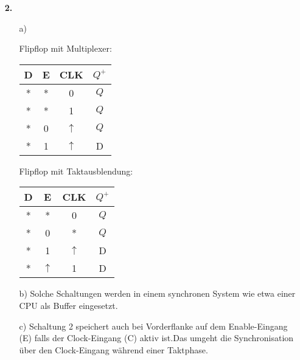 \documentclass[a4paper,10pt]{scrartcl}
\begin{document}
\begin{enumerate}
\begin{tikzpicture}[x=0.5cm,y=0.5cm]
    \end{tikzpicture}
    \vspace{1em}

    \item[\textbf{2.}]
        \begin{enumerate}
            \item[a)]
                \begin{minipage}[t]{0.4\textwidth}
                Flipflop mit Multiplexer:\\

                    \begin{tabular}{|c|c|c||c|}
                        \hline
                        D & E & CLK & $Q^+$ \\ \hline
                        * & * & 0   & $Q$ \\
                        * & * & 1   & $Q$ \\
                        * & 0 & $\uparrow$ & $Q$ \\
                        * & 1 & $\uparrow$ & D \\
                        \hline
                    \end{tabular}

                \end{minipage}
                \begin{minipage}[t]{0.4\textwidth}
                Flipflop mit Taktausblendung:\\

                    \begin{tabular}{|c|c|c||c|}
                        \hline
                        D & E & CLK & $Q^+$ \\ \hline
                        * & * & 0   & $Q$ \\
                        * & 0 & *   & $Q$ \\
                        * & 1 & $\uparrow$ & D \\
                        * & $\uparrow$ & 1 & D \\
                        \hline
                    \end{tabular}
                \end{minipage}
                \vspace{1em}

            \item[b)]
                Solche Schaltungen werden in einem synchronen System wie etwa einer CPU als Buffer eingesetzt.
            \item[c)]
                Schaltung 2 speichert auch bei Vorderflanke auf dem Enable-Eingang (E) falls der Clock-Eingang (C) aktiv ist.Das umgeht die Synchronisation über den Clock-Eingang während einer Taktphase.


\end{enumerate}
\end{enumerate}
\end{document}
